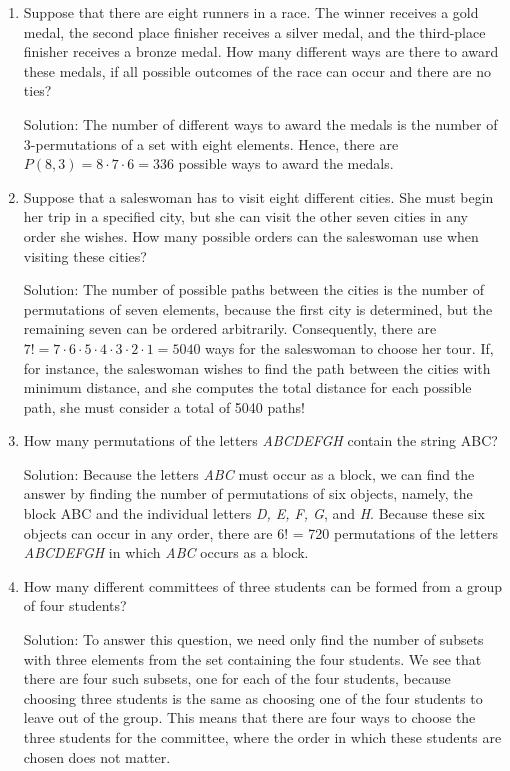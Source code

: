 \documentclass[11pt,a4paper]{book}
\begin{document}
\begin{enumerate}[label=Example~\arabic*]
\item Suppose that there are eight runners in a race.
The winner receives a gold medal, the second place finisher receives a silver medal, and the third-place finisher receives a bronze medal.
How many different ways are there to award these medals, if all possible outcomes of the race can occur and there are no ties?

Solution: The number of different ways to award the medals is the number of 3-permutations of a set with eight elements.
Hence, there are $P(8, 3) = 8 \cdot 7 \cdot 6 = 336$ possible ways to award the medals.

\item Suppose that a saleswoman has to visit eight different cities. 
She must begin her trip in a specified city, but she can visit the other seven cities in any order she wishes.
How many possible orders can the saleswoman use when visiting these cities?

Solution: The number of possible paths between the cities is the number of permutations of seven elements, because the first city is determined, but the remaining seven can be ordered arbitrarily. 
Consequently, there are $7! = 7 \cdot 6 \cdot 5 \cdot 4 \cdot 3 \cdot 2 \cdot 1 = 5040$ ways for the saleswoman to choose her tour.
If, for instance, the saleswoman wishes to find the path between the cities with minimum distance, and she computes the total distance for each possible path, she must consider a total of 5040 paths!

\item How many permutations of the letters \emph{ABCDEFGH} contain the string ABC?

Solution: Because the letters \emph{ABC} must occur as a block, we can find the answer by finding the number of permutations of six objects, namely, the block ABC and the individual letters \emph{D, E, F, G}, and\emph{ H}.
Because these six objects can occur in any order, there are 6! = 720 permutations of the letters \emph{ABCDEFGH} in which \emph{ABC} occurs as a block.

\item How many different committees of three students can be formed from a group of four students?

Solution: To answer this question, we need only find the number of subsets with three elements from the set containing the four students.
We see that there are four such subsets, one for each of the four students, because choosing three students is the same as choosing one of the four students to leave out of the group. 
This means that there are four ways to choose the three students for the committee, where the order in which these students are chosen does not matter.


\end{enumerate}
\end{document}

